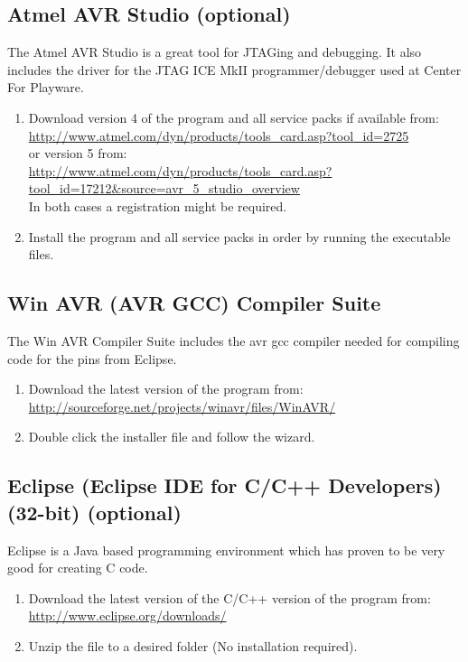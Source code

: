 \documentclass[a4paper, twoside, final]{book}%
\begin{document}
\subsection*{\bf Atmel AVR Studio (optional)}
The Atmel AVR Studio is a great tool for JTAGing and debugging. It also includes the driver for the JTAG ICE MkII programmer/debugger used at Center For Playware.
\begin{enumerate}
	\item Download version 4 of the program and all service packs if available from: \\
	\url{http://www.atmel.com/dyn/products/tools_card.asp?tool_id=2725}\\
or version 5 from: \\
\url{http://www.atmel.com/dyn/products/tools_card.asp?tool_id=17212&source=avr_5_studio_overview}\\
In both cases a registration might be required.	
	\item Install the program and all service packs in order by running the executable files.
\end{enumerate}

\subsection*{\bf Win AVR (AVR GCC) Compiler Suite}

The Win AVR Compiler Suite includes the avr gcc compiler needed for compiling code for the pins from Eclipse.
\begin{enumerate}
	\item Download the latest version of the program from: \\
	\url{http://sourceforge.net/projects/winavr/files/WinAVR/}
	\item Double click the installer file and follow the wizard.
\end{enumerate}

\subsection*{\bf Eclipse (Eclipse IDE for C/C++ Developers) (32-bit) (optional)}
Eclipse is a Java based programming environment which has proven to be very good for creating C code.
\begin{enumerate}
	\item Download the latest version of the C/C++ version of the program from: \\
	\url{http://www.eclipse.org/downloads/}
	\item Unzip the file to a desired folder (No installation required).
\end{enumerate}
\end{document}
